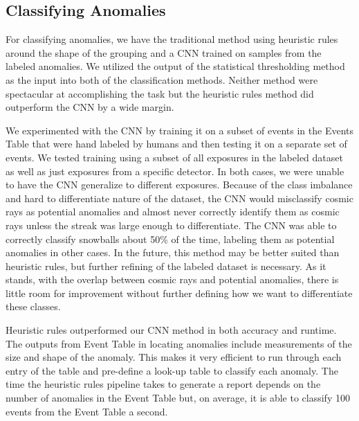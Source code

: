 \subsection{Classifying Anomalies}
For classifying anomalies, we have the traditional method using heuristic rules around the shape of the grouping and a CNN trained on samples from the labeled anomalies. 
We utilized the output of the statistical thresholding method as the input into both of the classification methods. 
Neither method were spectacular at accomplishing the task but the heuristic rules method did outperform the CNN by a wide margin. 

We experimented with the CNN by training it on a subset of events in the Events Table that were hand labeled by humans and then testing it on a separate set of events. 
We tested training using a subset of all exposures in the labeled dataset as well as just exposures from a specific detector.
In both cases, we were unable to have the CNN generalize to different exposures. 
Because of the class imbalance and hard to differentiate nature of the dataset, the CNN would misclassify cosmic rays as potential anomalies and almost never correctly identify them as cosmic rays unless the streak was large enough to differentiate. 
The CNN was able to correctly classify snowballs about 50\% of the time, labeling them as potential anomalies in other cases. 
In the future, this method may be better suited than heuristic rules, but further refining of the labeled dataset is necessary. 
As it stands, with the overlap between cosmic rays and potential anomalies, there is little room for improvement without further defining how we want to differentiate these classes. 

Heuristic rules outperformed our CNN method in both accuracy and runtime.
The outputs from Event Table in locating anomalies include measurements of the size and shape of the anomaly. 
This makes it very efficient to run through each entry of the table and pre-define a look-up table to classify each anomaly. 
The time the heuristic rules pipeline takes to generate a report depends on the number of anomalies in the Event Table but, on average, it is able to classify 100 events from the Event Table a second. 

